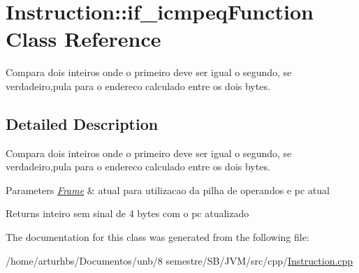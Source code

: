 \hypertarget{classInstruction_1_1if__icmpeqFunction}{}\section{Instruction\+:\+:if\+\_\+icmpeq\+Function Class Reference}
\label{classInstruction_1_1if__icmpeqFunction}


Compara dois inteiros onde o primeiro deve ser igual o segundo, se verdadeiro,pula para o endereco calculado entre os dois bytes.  




\subsection{Detailed Description}
Compara dois inteiros onde o primeiro deve ser igual o segundo, se verdadeiro,pula para o endereco calculado entre os dois bytes. 


\begin{DoxyParams}{Parameters}
{\em \hyperlink{classFrame}{Frame}} & atual para utilizacao da pilha de operandos e pc atual \\
\hline
\end{DoxyParams}
\begin{DoxyReturn}{Returns}
inteiro sem sinal de 4 bytes com o pc atualizado 
\end{DoxyReturn}


The documentation for this class was generated from the following file\+:\begin{DoxyCompactItemize}
\item 
/home/arturhbs/\+Documentos/unb/8 semestre/\+S\+B/\+J\+V\+M/src/cpp/\hyperlink{Instruction_8cpp}{Instruction.\+cpp}\end{DoxyCompactItemize}
